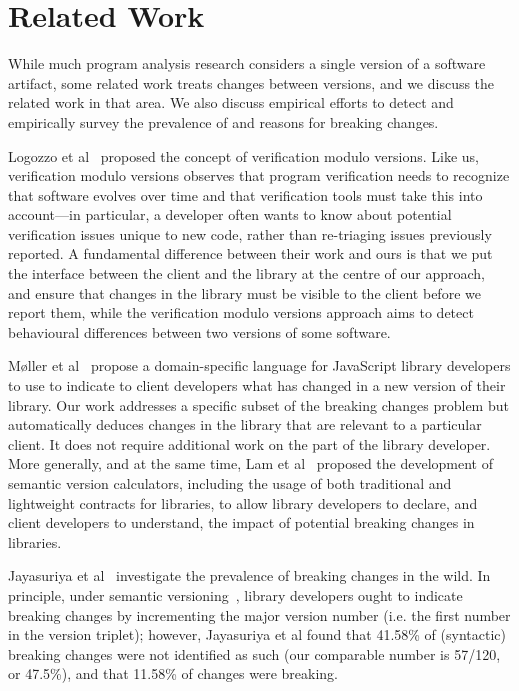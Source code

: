 \chapter{Related Work}\label{related}
While much program analysis research considers a single version of a software artifact, some related work treats changes between versions, and we discuss the related work in that area. We also discuss empirical efforts to detect and empirically survey the prevalence of and reasons for breaking changes.

Logozzo et al~\cite{logozzo14:_verif_modul_version} proposed the concept of verification modulo versions. Like us, verification modulo versions observes that program verification needs to recognize that software evolves over time and that verification tools must take this into account---in particular, a developer often wants to know about potential verification issues unique to new code, rather than re-triaging issues previously reported. A fundamental difference between their work and ours is that we put the interface between the client and the library at the centre of our approach, and ensure that changes in the library must be visible to the client before we report them, while the verification modulo versions approach aims to detect behavioural differences between two versions of some software.

Møller et al~\cite{møller20:_detec_locat_javas_progr_affec} propose a domain-specific language for JavaScript library developers to use to indicate to client developers what has changed in a new version of their library. Our work addresses a specific subset of the breaking changes problem but automatically deduces changes in the library that are relevant to a particular client. It does not require additional work on the part of the library developer. More generally, and at the same time, Lam et al~\cite{lam20:_puttin_seman_seman_version} proposed the development of semantic version calculators, including the usage of both traditional and lightweight contracts for libraries, to allow library developers to declare, and client developers to understand, the impact of potential breaking changes in libraries.

Jayasuriya et al~\cite{jayasuriya23:_under_break_chang_wild,jayasuriya24} investigate the prevalence of breaking changes in the wild. In principle, under semantic versioning~\cite{preston-werner23:_seman_version}, library developers ought to indicate breaking changes by incrementing the major version number (i.e. the first number in the version triplet); however, Jayasuriya et al found that 41.58\% of (syntactic) breaking changes were not identified as such (our comparable number is 57/120, or 47.5\%), and that 11.58\% of changes were breaking.

